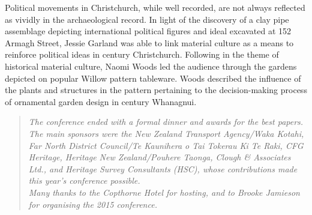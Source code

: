 Political movements in Christchurch, while well recorded, are not always reflected as vividly in the archaeological record. In light of the discovery of a clay pipe assemblage depicting international political figures and ideal excavated at 152 Armagh Street, Jessie Garland was able to link material culture as a means to reinforce political ideas in  century Christchurch. Following in the theme of historical material culture, Naomi Woods led the audience through the gardens depicted on popular Willow pattern tableware. Woods described the influence of the plants and structures in the pattern pertaining to the decision-making process of ornamental garden design in  century Whanagnui. 

\blockquote{\textit{The conference ended with a formal dinner and awards for the best papers. The main sponsors were the New Zealand Transport Agency/Waka Kotahi, Far North District Council/Te Kaunihera o Tai Tokerau Ki Te Raki, CFG Heritage, Heritage New Zealand/Pouhere Taonga, Clough \& Associates Ltd., and Heritage Survey Consultants (HSC), whose contributions made this year’s conference possible. 
\\\newline Many thanks to the Copthorne Hotel for hosting, and to Brooke Jamieson for organising the 2015 conference.}}


\label{NZAA:lastpage}
\closingarticle